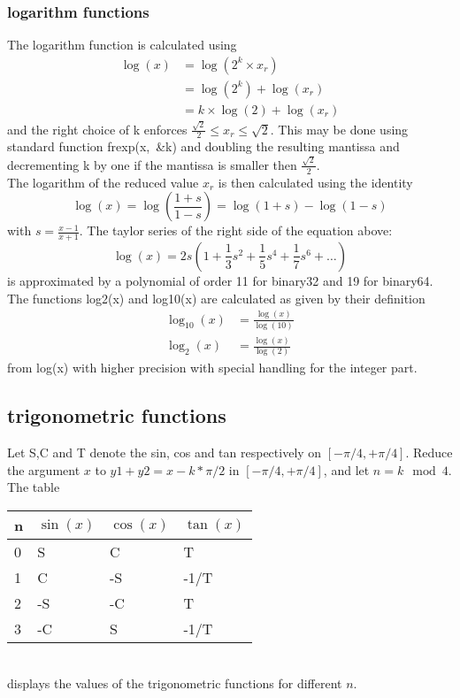 \documentclass[10pt,a4paper,final,oneside]{article}
\numberwithin{equation}{subsection}
\begin{document}
\subsubsection{logarithm functions}
%
The logarithm function is calculated using
\begin{equation}
    \begin{aligned}
        \log(x) &= \log(2^k \times x_r)  \\
                &= \log(2^k) + \log(x_r)  \\
                &= k \times \log(2) + \log(x_r)
  \end{aligned}
\end{equation}
and the right choice of k enforces
$ \frac{\sqrt{2}}{2} \le x_r \le \sqrt{2} $.
This may be done using standard function \mbox{frexp(x, \&k)} and doubling
the resulting mantissa and decrementing k by one if the mantissa is
smaller then $\frac{\sqrt{2}}{2}$.\\[10pt]
%
The logarithm of the reduced value $x_r$ is then calculated using the
identity
\begin{equation}
  \log(x) = \log \left( \frac{1+s}{1-s} \right) = \log(1+s) - \log(1-s)
\end{equation}
with $  s= \frac{x-1}{x+1} $.
The taylor series of the right side of the equation above:
\begin{displaymath}
\log(x) = 2s
\left( 1 + \frac{1}{3} s^2 + \frac{1}{5} s^4 + \frac{1}{7} s^6 + \dots  \right)
\end{displaymath}
is approximated by a polynomial of order 11 for binary32 and 19 for binary64.
%
The functions log2(x) and log10(x) are calculated as given by their definition
\[
    \begin{aligned}
        \log_{10}(x) &= \frac{\log(x)}{\log(10)}\\
        \log_{2}(x) &= \frac{\log(x)}{\log(2)}
    \end{aligned}
\]
from log(x) with higher precision with special handling for the integer part.

\subsection{trigonometric functions}

Let S,C and T denote the sin, cos and tan respectively on
$ \left[ -\pi/4, +\pi/4 \right] $.
Reduce the argument $x$ to $y1+y2 = x-k*\pi/2$
in $ \left[ -\pi/4, +\pi/4 \right] $, and let $n = k \mod 4 $.
The table\\[12pt]
\begin{tabular}{ | p{2.0cm} | p{2.5cm} | p{2.5cm} | p{2.5cm} |}
    \hline
    n & $\sin(x)$ &  $\cos(x)$ & $\tan(x)$ \\
    \hline
    0 & S &  C & T \\
    1 & C &  -S & -1/T \\
    2 & -S &  -C & T \\
    3 & -C &  S & -1/T \\
    \hline
\end{tabular}\\[12pt]
displays the values of the trigonometric functions for different $n$.
\end{document}
